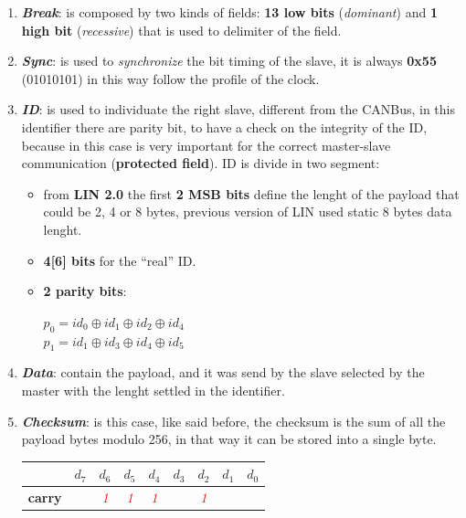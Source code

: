\begin{enumerate}[nosep]
    \item \textbf{\textit{Break}}: is composed by two kinds of fields: \textbf{13 low bits} (\textit{dominant}) and \textbf{1 high bit} (\textit{recessive}) that is used to delimiter of the field.
    \item \textbf{\textit{Sync}}: is used to \textit{synchronize} the bit timing of the slave, it is always \textbf{0x55} (01010101) in this way follow the profile of the clock.
    \item \textbf{\textit{ID}}: is used to individuate the right slave, different from the CANBus, in this identifier there are parity bit, to have a check on the integrity of the ID, because in this case is very important for the correct master-slave communication (\textbf{protected field}). ID is divide in two segment:
    \begin{itemize}[nosep]
        \item from \textbf{LIN 2.0} the first \textbf{2 MSB bits} define the lenght of the payload that could be 2, 4 or 8 bytes, previous version of LIN used static 8 bytes data lenght.
        \item \textbf{4[6] bits} for the ``real'' ID.
        \item \textbf{2 parity bits}:
        \begin{center}
            $p_0 = id_0 \oplus id_1 \oplus id_2 \oplus id_4$ \\
            $p_1 = id_1 \oplus id_3 \oplus id_4 \oplus id_5$
        \end{center}
    \end{itemize}
    \item \textbf{\textit{Data}}: contain the payload, and it was send by the slave selected by the master with the lenght settled in the identifier.
    \item \textbf{\textit{Checksum}}: is this case, like said before, the checksum is the sum of all the payload bytes modulo 256, in that way it can be stored into a single byte.
    \begin{center}
        \begin{tabular}{ | c |  c |  c |  c |  c |  c |  c |  c |  c | } \hline
            & $d_7$ & $d_6$ & $d_5$ & $d_4$ & $d_3$ & $d_2$ & $d_1$ & $d_0$ \\ \hline
            \textbf{carry} & & \textcolor{red}{\textit{1}} & \textcolor{red}{\textit{1}} & \textcolor{red}{\textit{1}} & & \textcolor{red}{\textit{1}} & & \\ \hline

\end{tabular}
\end{center}
\end{enumerate}
